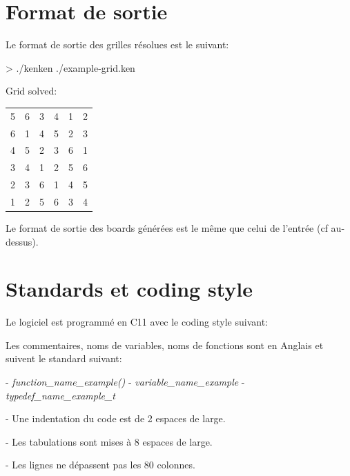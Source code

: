 \documentclass[1]{report}
\begin{document}
    \section{Format de sortie} 
    
    Le format de sortie des grilles résolues est le suivant: \newline

    > ./kenken ./example-grid.ken \newline
    
    Grid solved: \newline
    \begin{tabular}{c c c c c c}
    5 & 6 & 3 & 4 & 1 & 2 \\
    6 & 1 & 4 & 5 & 2 & 3 \\
    4 & 5 & 2 & 3 & 6 & 1 \\
    3 & 4 & 1 & 2 & 5 & 6 \\
    2 & 3 & 6 & 1 & 4 & 5 \\
    1 & 2 & 5 & 6 & 3 & 4 \\
    \end{tabular} \newline

            Le format de sortie des boards générées est le même que celui de l'entrée (cf au-dessus).

        \section{Standards et coding style}
            
            Le logiciel est programmé en C11 avec le coding style suivant: \newline

            Les commentaires, noms de variables, noms de fonctions sont en Anglais et suivent le standard suivant: \newline
            
            - \textit{function\_name\_example()} \newline
            - \textit{variable\_name\_example} \newline
            - \textit{typedef\_name\_example\_t} \newline

            - Une indentation du code est de 2 espaces de large.
            
            - Les tabulations sont mises à 8 espaces de large.
            
            - Les lignes ne dépassent pas les 80 colonnes.
            
\end{document}
